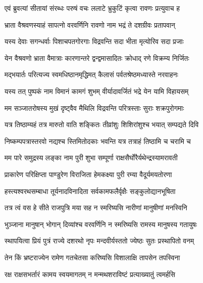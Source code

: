 
\twolineshloka
{एवं ब्रुवत्यां सीतायां संरब्धः परुषं वचः}
{ललाटे भ्रुकुटिं कृत्वा रावणः प्रत्युवाच ह} %

\twolineshloka
{भ्राता वैश्रवणस्याहं सापत्नो वरवर्णिनि}
{रावणो नाम भद्रं ते दशग्रीवः प्रतापवान्} %

\twolineshloka
{यस्य देवाः सगन्धर्वाः पिशाचपतगोरगाः}
{विद्रवन्ति सदा भीता मृत्योरिव सदा प्रजाः} %

\twolineshloka
{येन वैश्रवणो भ्राता वैमात्राः कारणान्तरे}
{द्वन्द्वमासादितः क्रोधाद् रणे विक्रम्य निर्जितः} %

\twolineshloka
{मद्भयार्तः परित्यज्य स्वमधिष्ठानमृद्धिमत्}
{कैलासं पर्वतश्रेष्ठमध्यास्ते नरवाहनः} %

\twolineshloka
{यस्य तत् पुष्पकं नाम विमानं कामगं शुभम्}
{वीर्यादावर्जितं भद्रे येन यामि विहायसम्} %

\twolineshloka
{मम सञ्जातरोषस्य मुखं दृष्ट्वैव मैथिलि}
{विद्रवन्ति परित्रस्ताः सुराः शक्रपुरोगमाः} %

\twolineshloka
{यत्र तिष्ठाम्यहं तत्र मारुतो वाति शङ्कितः}
{तीव्रांशुः शिशिरांशुश्च भयात् सम्पद्यते दिवि} %

\twolineshloka
{निष्कम्पपत्रास्तरवो नद्यश्च स्तिमितोदकाः}
{भवन्ति यत्र तत्राहं तिष्ठामि च चरामि च} %

\twolineshloka
{मम पारे समुद्रस्य लङ्का नाम पुरी शुभा}
{सम्पूर्णा राक्षसैर्घोरैर्यथेन्द्रस्यामरावती} %

\twolineshloka
{प्राकारेण परिक्षिप्ता पाण्डुरेण विराजिता}
{हेमकक्ष्या पुरी रम्या वैदूर्यमयतोरणा} %

\twolineshloka
{हस्त्यश्वरथसम्बाधा तूर्यनादविनादिता}
{सर्वकामफलैर्वृक्षैः सङ्कुलोद्यानभूषिता} %

\twolineshloka
{तत्र त्वं वस हे सीते राजपुत्रि मया सह}
{न स्मरिष्यसि नारीणां मानुषीणां मनस्विनि} %

\twolineshloka
{भुञ्जाना मानुषान् भोगान् दिव्यांश्च वरवर्णिनि}
{न स्मरिष्यसि रामस्य मानुषस्य गतायुषः} %

\twolineshloka
{स्थापयित्वा प्रियं पुत्रं राज्ये दशरथो नृपः}
{मन्दवीर्यस्ततो ज्येष्ठः सुतः प्रस्थापितो वनम्} %

\twolineshloka
{तेन किं भ्रष्टराज्येन रामेण गतचेतसा}
{करिष्यसि विशालाक्षि तापसेन तपस्विना} %

\twolineshloka
{रक्ष राक्षसभर्तारं कामय स्वयमागतम्}
{न मन्मथशराविष्टं प्रत्याख्यातुं त्वमर्हसि} %

